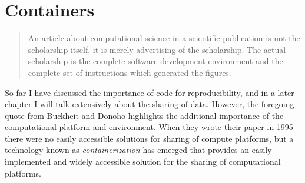 

\section{Containers}

\begin{quote}
An article about computational science in a scientific publication is not the scholarship itself, it is merely advertising of the scholarship. The actual scholarship is the complete software development environment and the complete set of instructions which generated the figures. \citep{Buckheit:1995aa}
\end{quote}

So far I have discussed the importance of code for reproducibility, and in a later chapter I will talk extensively about the sharing of data. However, the foregoing quote from Buckheit and Donoho highlights the additional importance of the computational platform and environment.  When they wrote their paper in 1995 there were no easily accessible solutions for sharing of compute platforms, but a technology known as \textit{containerization} has emerged that provides an easily implemented and widely accessible solution for the sharing of computational platforms.

